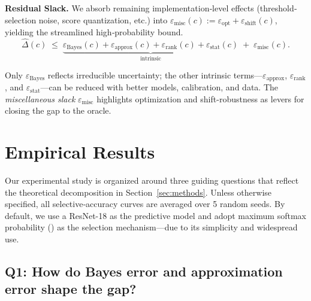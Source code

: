\textbf{Residual Slack.}  We absorb remaining implementation‐level effects (threshold‐selection noise, score quantization, etc.) into $\varepsilon_{\text{misc}}(c) :=\varepsilon_{\text{opt}}+\varepsilon_{\text{shift}}(c)$, yielding the streamlined high‐probability bound.
\begin{equation}
  \widehat\Delta(c)
  \;\le\;
  \underbrace{\varepsilon_{\text{Bayes}}(c)
               +\varepsilon_{\text{approx}}(c)
               +\varepsilon_{\text{rank}}(c)
               +\varepsilon_{\text{stat}}(c)}_{\text{intrinsic}}
  \;+\;
  \varepsilon_{\text{misc}}(c).
\end{equation}

\begin{takeaway}
Only \(\varepsilon_{\text{Bayes}}\) reflects irreducible uncertainty; the other intrinsic terms—\(\varepsilon_{\text{approx}}\), \(\varepsilon_{\text{rank}}\), and \(\varepsilon_{\text{stat}}\)—can be reduced with better models, calibration, and data. The \emph{miscellaneous slack} \(\varepsilon_{\text{misc}}\) highlights optimization and shift-robustness as levers for closing the gap to the oracle.
\end{takeaway}


\section{Empirical Results}
\label{sec:experiments}

Our experimental study is organized around three guiding questions that reflect the theoretical decomposition in Section~\ref{sec:methods}. Unless otherwise specified, all selective‑accuracy curves are averaged over 5 random seeds. By default, we use a ResNet-18 as the predictive model and adopt maximum softmax probability (\msp) as the selection mechanism---due to its simplicity and widespread use.

\subsection{Q1: How do Bayes error and approximation error shape the gap?}

